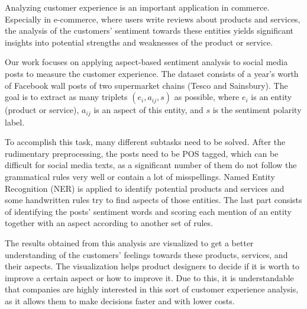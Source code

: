 Analyzing customer experience is an important application in commerce. Especially in e-commerce, where users write reviews about products and services, the analysis of the customers' sentiment towards these entities yields significant insights into potential strengths and weaknesses of the product or service.

Our work focuses on applying aspect-based sentiment analysis to social media posts to measure the customer experience. The dataset consists of a year's worth of Facebook wall posts of two supermarket chains (Tesco and Sainsbury). The goal is to extract as many triplets $(e_i, a_{ij}, s)$ as possible, where $e_i$ is an entity (product or service), $a_{ij}$ is an aspect of this entity, and $s$ is the sentiment polarity label.

To accomplish this task, many different subtasks need to be solved. After the rudimentary preprocessing, the posts need to be POS tagged, which can be difficult for social media texts, as a significant number of them do not follow the grammatical rules very well or contain a lot of misspellings. Named Entity Recognition (NER) is applied to identify potential products and services and some handwritten rules try to find aspects of those entities. The last part consists of identifying the posts' sentiment words and scoring each mention of an entity together with an aspect according to another set of rules.

The results obtained from this analysis are visualized to get a better understanding of the customers' feelings towards these products, services, and their aspects. The visualization helps product designers to decide if it is worth to improve a certain aspect or how to improve it. Due to this, it is understandable that companies are highly interested in this sort of customer experience analysis, as it allows them to make decisions faster and with lower costs.